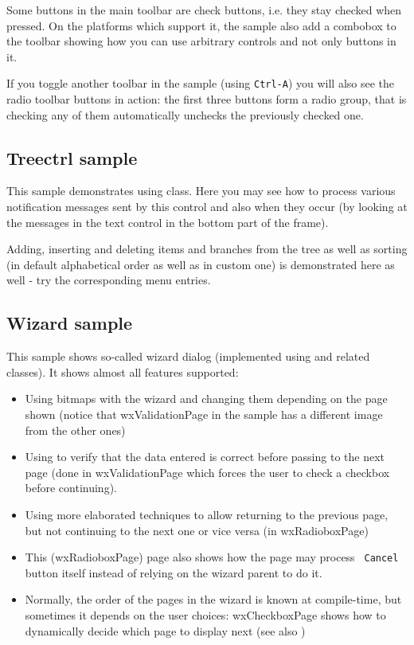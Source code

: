 Some buttons in the main toolbar are check buttons, i.e. they stay checked when
pressed. On the platforms which support it, the sample also add a combobox
to the toolbar showing how you can use arbitrary controls and not only buttons
in it.

If you toggle another toolbar in the sample (using {\tt Ctrl-A}) you will also
see the radio toolbar buttons in action: the first three buttons form a radio
group, that is checking any of them automatically unchecks the previously
checked one.


\subsection{Treectrl sample}\label{sampletreectrl}

This sample demonstrates using  class. Here
you may see how to process various notification messages sent by this control
and also when they occur (by looking at the messages in the text control in
the bottom part of the frame).

Adding, inserting and deleting items and branches from the tree as well as
sorting (in default alphabetical order as well as in custom one) is
demonstrated here as well - try the corresponding menu entries.


\subsection{Wizard sample}\label{samplewizard}

This sample shows so-called wizard dialog (implemented using 
 and related classes). It shows almost all
features supported:

\begin{itemize}\itemsep=0pt
\item Using bitmaps with the wizard and changing them depending on the page
shown (notice that wxValidationPage in the sample has a different image from
the other ones)
\item Using  
to verify that the data entered is correct before passing to the next page
(done in wxValidationPage which forces the user to check a checkbox before
continuing).
\item Using more elaborated techniques to allow returning to the previous
page, but not continuing to the next one or vice versa (in wxRadioboxPage)
\item This (wxRadioboxPage) page also shows how the page may process {\tt
Cancel} button itself instead of relying on the wizard parent to do it.
\item Normally, the order of the pages in the wizard is known at compile-time,
but sometimes it depends on the user choices: wxCheckboxPage shows how to
dynamically decide which page to display next (see also 
)
\end{itemize}


